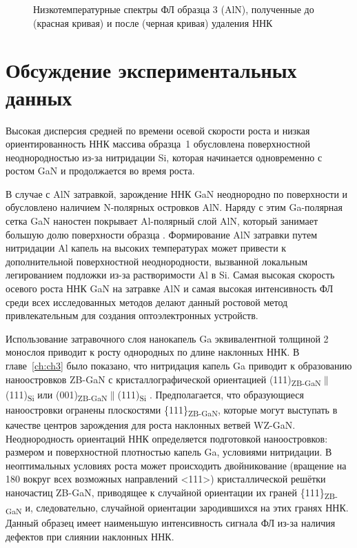 \begin{figure}[ht]
	\caption{Низкотемпературные спектры ФЛ образца 3 (AlN), полученные до (красная кривая) и после (черная кривая) удаления ННК}\label{fig:Image_30_2}
\end{figure}

\section{Обсуждение экспериментальных данных}\label{sec:ch4/sec5}

Высокая дисперсия средней по времени осевой скорости роста и низкая ориентированность ННК массива образца~1 обусловлена поверхностной неоднородностью из-за нитридации Si, которая начинается одновременно с ростом GaN и продолжается во время роста.

В случае с AlN затравкой, зарождение ННК GaN неоднородно по поверхности и обусловлено наличием N-полярных островков AlN. Наряду с этим Ga-полярная сетка GaN наностен покрывает Al-полярный слой AlN, который занимает большую долю поверхности образца \cite{Auzelle2015}. Формирование AlN затравки путем нитридации Al капель на высоких температурах может привести к дополнительной поверхностной неоднородности, вызванной локальным легированием подложки из-за растворимости Al в Si. Самая высокая скорость осевого роста ННК GaN на затравке AlN и самая высокая интенсивность ФЛ среди всех исследованных методов делают данный ростовой метод привлекательным для создания оптоэлектронных устройств.

Использование затравочного слоя нанокапель Ga эквивалентной толщиной 2 монослоя приводит к росту однородных по длине наклонных ННК. В главе~\cref{ch:ch3} было показано, что нитридация капель Ga приводит к образованию наноостровков ZB-GaN с кристаллографической ориентацией (111)\textsubscript{ZB-GaN}\(\parallel\)(111)\textsubscript{Si} или (001)\textsubscript{ZB-GaN}\(\parallel\)(111)\textsubscript{Si} \cite{Fedorov2018}. Предполагается, что образующиеся наноостровки огранены плоскостями \{111\}\textsubscript{ZB-GaN}, которые могут выступать в качестве центров зарождения для роста наклонных ветвей WZ-GaN. Неоднородность ориентаций ННК определяется подготовкой наноостровков: размером и поверхностной плотностью капель Ga, условиями нитридации. В неоптимальных условиях роста может происходить двойникование (вращение на 180{\textdegree} вокруг всех возможных направлений <111>) кристаллической решётки наночастиц ZB-GaN, приводящее к случайной ориентации их граней \{111\}\textsubscript{ZB-GaN} и, следовательно, случайной ориентации зародившихся на этих гранях ННК. Данный образец имеет наименьшую интенсивность сигнала ФЛ из-за наличия дефектов при слиянии наклонных ННК.

